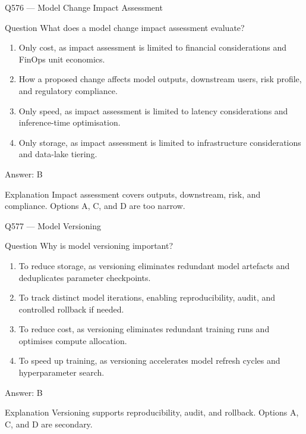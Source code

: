 \documentclass[aspectratio=169,8pt]{beamer}
\begin{document}
	\begin{frame}{Q576 --- Model Change Impact Assessment}
		\begin{block}{Question}
			What does a model change impact assessment evaluate?
			\begin{enumerate}
				\item Only cost, as impact assessment is limited to financial considerations and FinOps unit economics.
				\item How a proposed change affects model outputs, downstream users, risk profile, and regulatory compliance.
				\item Only speed, as impact assessment is limited to latency considerations and inference-time optimisation.
				\item Only storage, as impact assessment is limited to infrastructure considerations and data-lake tiering.
			\end{enumerate}
		\end{block}
		\begin{exampleblock}{Answer: B}\end{exampleblock}
		\begin{block}{Explanation}
			Impact assessment covers outputs, downstream, risk, and compliance. Options A, C, and D are too narrow.
		\end{block}
	\end{frame}
	
	\begin{frame}{Q577 --- Model Versioning}
		\begin{block}{Question}
			Why is model versioning important?
			\begin{enumerate}
				\item To reduce storage, as versioning eliminates redundant model artefacts and deduplicates parameter checkpoints.
				\item To track distinct model iterations, enabling reproducibility, audit, and controlled rollback if needed.
				\item To reduce cost, as versioning eliminates redundant training runs and optimises compute allocation.
				\item To speed up training, as versioning accelerates model refresh cycles and hyperparameter search.
			\end{enumerate}
		\end{block}
		\begin{exampleblock}{Answer: B}\end{exampleblock}
		\begin{block}{Explanation}
			Versioning supports reproducibility, audit, and rollback. Options A, C, and D are secondary.
		\end{block}
	\end{frame}
	
\end{document}
